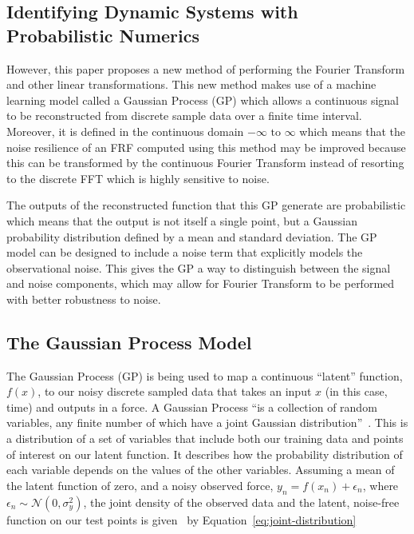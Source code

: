 \documentclass[12pt]{article}
\begin{document}
    \subsection{Identifying Dynamic Systems with Probabilistic Numerics}
    However, this paper proposes a new method of performing the Fourier Transform and other linear transformations.
    This new method makes use of a machine learning model called a Gaussian Process (GP) which allows a continuous signal to be reconstructed from discrete sample data over a finite time interval.
    Moreover, it is defined in the continuous domain $-\infty \text{ to } \infty$ which means that the noise resilience of an FRF computed using this method may be improved because this can be transformed by the continuous Fourier Transform instead of resorting to the discrete FFT which is highly sensitive to noise.

    The outputs of the reconstructed function that this GP generate are probabilistic which means that the output is not itself a single point, but a Gaussian probability distribution defined by a mean and standard deviation.
    The GP model can be designed to include a noise term that explicitly models the observational noise.
    This gives the GP a way to distinguish between the signal and noise components, which may allow for Fourier Transform to be performed with better robustness to noise.

    \subsection{The Gaussian Process Model}
    The Gaussian Process (GP) is being used to map a continuous ``latent'' function, $f(x)$, to our noisy discrete sampled data that takes an input $x$ (in this case, time) and outputs in a force.
    A Gaussian Process ``is a collection of random variables, any finite number of which have a joint Gaussian distribution''~\cite{rasmussen2006gaussian}.
    This is a distribution of a set of variables that include both our training data and points of interest on our latent function.
    It describes how the probability distribution of each variable depends on the values of the other variables.
    Assuming a mean of the latent function of zero, and a noisy observed force, $y_n = f(x_n)+\epsilon_n$, where $\epsilon_n \sim \mathcal{N}(0, \sigma^2_y)$, the joint density of the observed data and the latent, noise-free function on our test points is given~\cite{murphy2023probabilistic} by Equation~\ref{eq:joint-distribution}
\end{document}
